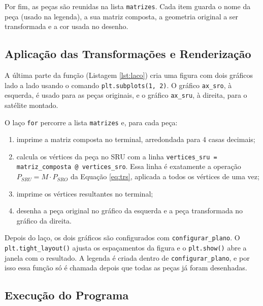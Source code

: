 \documentclass{article}
\begin{document}
Por fim, as peças são reunidas na lista \texttt{matrizes}. Cada item guarda o nome da peça (usado na legenda), a sua matriz composta, a geometria original a ser transformada e a cor usada no desenho.



\subsection{Aplicação das Transformações e Renderização}

A última parte da função (Listagem \ref{lst:laco}) cria uma figura com dois gráficos lado a lado usando o comando \texttt{plt.subplots(1, 2)}. O gráfico \texttt{ax\_sro}, à esquerda, é usado para as peças originais, e o gráfico \texttt{ax\_sru}, à direita, para o satélite montado.

O laço \texttt{for} percorre a lista \texttt{matrizes} e, para cada peça:

\begin{enumerate}
    \item imprime a matriz composta no terminal, arredondada para 4 casas decimais;
    \item calcula os vértices da peça no SRU com a linha \texttt{vertices\_sru = matriz\_composta @ vertices\_sro}. Essa linha é exatamente a operação $P_{SRU} = M \cdot P_{SRO}$ da Equação \ref{eq:trs}, aplicada a todos os vértices de uma vez;
    \item imprime os vértices resultantes no terminal;
    \item desenha a peça original no gráfico da esquerda e a peça transformada no gráfico da direita.
\end{enumerate}

Depois do laço, os dois gráficos são configurados com \texttt{configurar\_plano}. O \texttt{plt.tight\_layout()} ajusta os espaçamentos da figura e o \texttt{plt.show()} abre a janela com o resultado. A legenda é criada dentro de \texttt{configurar\_plano}, e por isso essa função só é chamada depois que todas as peças já foram desenhadas.



\subsection{Execução do Programa}
\end{document}
